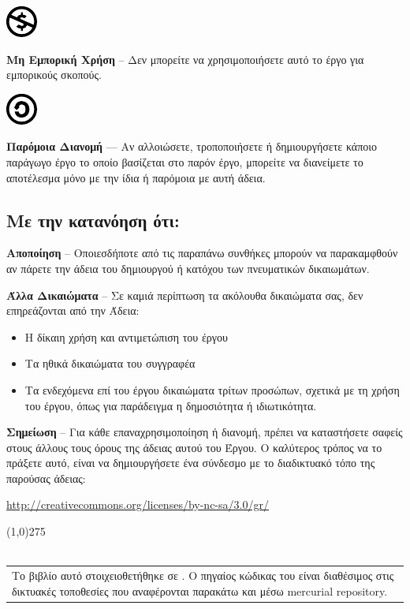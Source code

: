 \vspace{1em}
\noindent
\parbox{1.5cm}{\includegraphics[scale=0.15]{images/license/cc_nc_30}}
\parbox{10.5cm}{\textbf{Μη Εμπορική Χρήση} --  Δεν μπορείτε να χρησιμοποιήσετε αυτό το έργο για εμπορικούς σκοπούς.}

\vspace{1em}
\noindent
\parbox{1.5cm}{\includegraphics[scale=0.15]{images/license/cc_sa_30}}
\parbox{10.5cm}{\textbf{Παρόμοια Διανομή}  — Αν αλλοιώσετε, τροποποιήσετε ή δημιουργήσετε κάποιο παράγωγο έργο το οποίο βασίζεται στο παρόν έργο, μπορείτε να διανείμετε το αποτέλεσμα μόνο με την ίδια ή παρόμοια με αυτή άδεια.}

\subsection*{Με την κατανόηση ότι:}

\noindent
\textbf{Αποποίηση} -- Οποιεσδήποτε από τις παραπάνω συνθήκες μπορούν να παρακαμφθούν αν πάρετε την άδεια του δημιουργού ή κατόχου των πνευματικών δικαιωμάτων.

\vspace{1em}
\noindent
\textbf{Άλλα Δικαιώματα} -- Σε καμιά περίπτωση τα ακόλουθα δικαιώματα σας, δεν επηρεάζονται από την Άδεια:

\begin{itemize}
  \item Η δίκαιη χρήση και αντιμετώπιση του έργου
  \item Τα ηθικά δικαιώματα του συγγραφέα
  \item Τα ενδεχόμενα επί του έργου δικαιώματα τρίτων προσώπων, σχετικά με τη χρήση του έργου, όπως για παράδειγμα η δημοσιότητα ή ιδιωτικότητα.
\end{itemize}

\vspace{1em}
\noindent
\textbf{Σημείωση} -- Για κάθε επαναχρησιμοποίηση ή διανομή, πρέπει να καταστήσετε σαφείς στους άλλους τους όρους της άδειας αυτού του Έργου. Ο καλύτερος τρόπος να το πράξετε αυτό, είναι να δημιουργήσετε ένα σύνδεσμο με το διαδικτυακό τόπο της παρούσας άδειας:
\begin{center}
\url{http://creativecommons.org/licenses/by-nc-sa/3.0/gr/}
\end{center}
\line(1,0){275}\\\\
\begin{tabular}{p{}}
Το βιβλίο αυτό στοιχειοθετήθηκε σε \XeLaTeX{}.  Ο πηγαίος κώδικας του είναι διαθέσιμος στις δικτυακές τοποθεσίες που αναφέρονται παρακάτω και μέσω mercurial repository.\\
\end{tabular}

